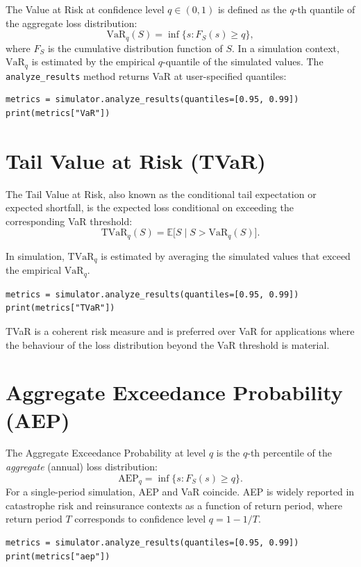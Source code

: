 The Value at Risk at confidence level $q \in (0, 1)$ is defined as
the $q$-th quantile of the aggregate loss distribution:
\[
    \mathrm{VaR}_q(S) = \inf \{ s : F_S(s) \geq q \},
\]
where $F_S$ is the cumulative distribution function of $S$. In a
simulation context, $\mathrm{VaR}_q$ is estimated by the empirical
$q$-quantile of the simulated values. The
\texttt{analyze\_results} method returns VaR at user-specified
quantiles:

\begin{lstlisting}[style=pythonstyle]
metrics = simulator.analyze_results(quantiles=[0.95, 0.99])
print(metrics["VaR"])
\end{lstlisting}

\section{Tail Value at Risk (TVaR)}

The Tail Value at Risk, also known as the conditional tail expectation
or expected shortfall, is the expected loss conditional on exceeding
the corresponding VaR threshold:
\[
    \mathrm{TVaR}_q(S) = \mathbb{E}\big[ S \mid S > \mathrm{VaR}_q(S) \big].
\]

In simulation, $\mathrm{TVaR}_q$ is estimated by averaging the
simulated values that exceed the empirical $\mathrm{VaR}_q$.

\begin{lstlisting}[style=pythonstyle]
metrics = simulator.analyze_results(quantiles=[0.95, 0.99])
print(metrics["TVaR"])
\end{lstlisting}

TVaR is a coherent risk measure and is preferred over VaR for
applications where the behaviour of the loss distribution beyond
the VaR threshold is material.

\section{Aggregate Exceedance Probability (AEP)}

The Aggregate Exceedance Probability at level $q$ is the $q$-th
percentile of the \emph{aggregate} (annual) loss distribution:
\[
    \mathrm{AEP}_q = \inf \{ s : F_S(s) \geq q \}.
\]
For a single-period simulation, AEP and VaR coincide. AEP is widely
reported in catastrophe risk and reinsurance contexts as a function of
return period, where return period $T$ corresponds to confidence level
$q = 1 - 1/T$.

\begin{lstlisting}[style=pythonstyle]
metrics = simulator.analyze_results(quantiles=[0.95, 0.99])
print(metrics["aep"])
\end{lstlisting}

